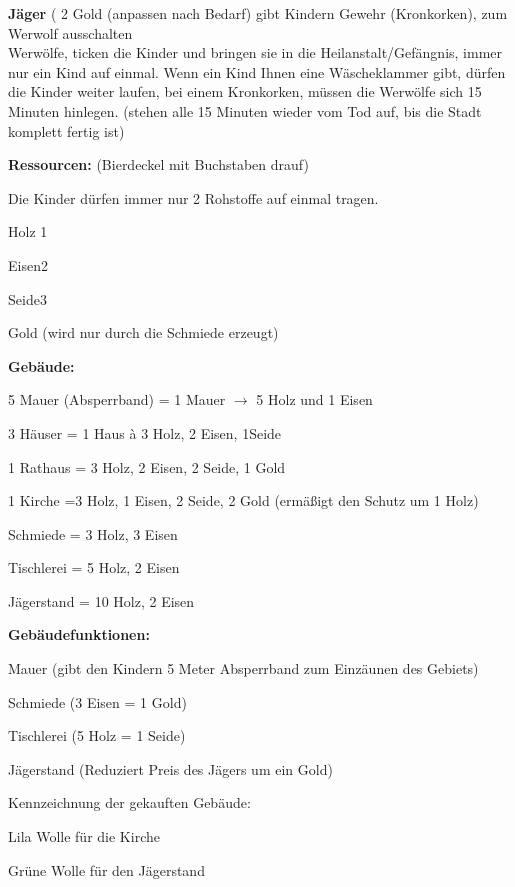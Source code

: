 \textbf{Jäger} ( 2 Gold (anpassen nach Bedarf) gibt Kindern Gewehr (Kronkorken), zum Werwolf ausschalten  \\

Werwölfe, ticken die Kinder und bringen sie in die Heilanstalt/Gefängnis, immer nur ein Kind auf einmal. Wenn ein Kind Ihnen eine Wäscheklammer gibt, dürfen die Kinder weiter laufen, bei einem Kronkorken, müssen die Werwölfe sich 15 Minuten hinlegen.  (stehen alle 15 Minuten wieder vom Tod auf, bis die Stadt komplett fertig ist) 

\textbf{Ressourcen:} (Bierdeckel mit Buchstaben drauf) 

Die Kinder dürfen immer nur 2 Rohstoffe auf einmal tragen. 

Holz 1  

Eisen2  

Seide3  

Gold (wird nur durch die Schmiede erzeugt) 

 

\textbf{Gebäude:}  

5 Mauer (Absperrband) = 1 Mauer $\rightarrow$ 5 Holz und 1 Eisen  

3 Häuser = 1 Haus à 3 Holz, 2 Eisen, 1Seide 

1 Rathaus = 3 Holz, 2 Eisen, 2 Seide, 1 Gold  

1 Kirche =3 Holz, 1 Eisen, 2 Seide, 2 Gold (ermäßigt den Schutz um 1 Holz) 

 

Schmiede = 3 Holz, 3 Eisen 

Tischlerei = 5 Holz, 2 Eisen  

Jägerstand = 10 Holz, 2 Eisen  

 

\textbf{Gebäudefunktionen:} 

Mauer (gibt den Kindern 5 Meter Absperrband zum Einzäunen des Gebiets) 

Schmiede (3 Eisen = 1 Gold) 

Tischlerei (5 Holz = 1 Seide) 

Jägerstand (Reduziert Preis des Jägers um ein Gold) 

 

Kennzeichnung der gekauften Gebäude:  

Lila Wolle für die Kirche  

Grüne Wolle für den Jägerstand  